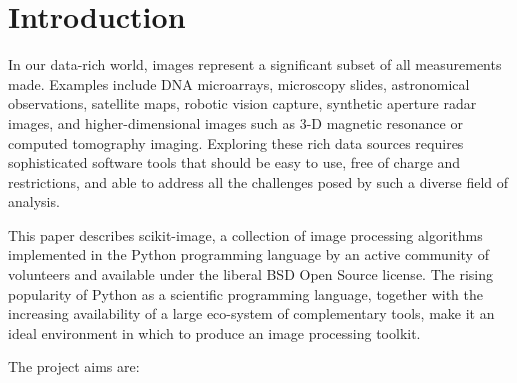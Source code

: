 \documentclass[fleqn,12pt]{wlpeerj}
\begin{document}

\section*{Introduction}
\label{sec:introduction}

In our data-rich world, images represent a significant subset of all measurements made. Examples include DNA microarrays, microscopy slides, astronomical observations, satellite maps, robotic vision capture, synthetic aperture radar images, and higher-dimensional images such as 3-D magnetic resonance or computed tomography imaging. Exploring these rich data sources requires sophisticated software tools that should be easy to use, free of charge and restrictions, and able to address all the challenges posed by such a diverse field of analysis.

This paper describes scikit-image, a collection of image processing algorithms implemented in the Python programming language by an active community of volunteers and available under the liberal BSD Open Source license. The rising popularity of Python as a scientific programming language, together with the increasing availability of a large eco-system of complementary tools, make it an ideal environment in which to produce an image processing toolkit.

The project aims are:
\end{document}
